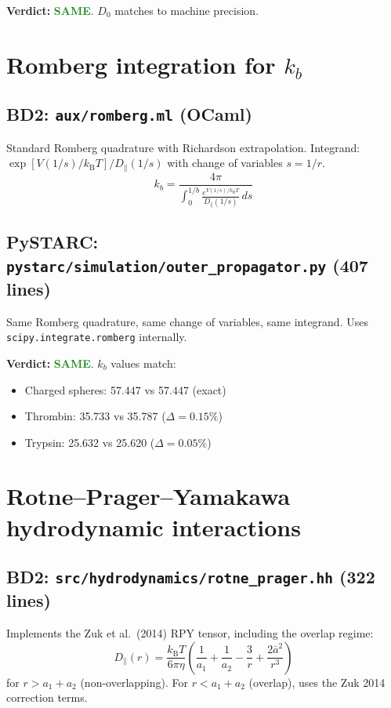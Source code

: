 \documentclass[11pt]{article}
\newcommand{\kBT}{k_{\mathrm{B}}T}
\newcommand{\same}{\textcolor{ForestGreen}{\textbf{SAME}}}
\begin{document}
\textbf{Verdict:} \same. $D_0$ matches to machine precision.


\section{Romberg integration for $k_b$}

\subsection{BD2: \texttt{aux/romberg.ml} (OCaml)}
Standard Romberg quadrature with Richardson extrapolation.
Integrand: $\exp[V(1/s)/\kBT] / D_\parallel(1/s)$ with change of variables $s = 1/r$.
\begin{equation}
k_b = \frac{4\pi}{\int_0^{1/b} \frac{e^{V(1/s)/\kBT}}{D_\parallel(1/s)}\,ds}
\end{equation}

\subsection{PySTARC: \texttt{pystarc/simulation/outer\_propagator.py} (407 lines)}
Same Romberg quadrature, same change of variables, same integrand.
Uses \texttt{scipy.integrate.romberg} internally.

\textbf{Verdict:} \same. $k_b$ values match:
\begin{itemize}
\item Charged spheres: 57.447 vs 57.447 (exact)
\item Thrombin: 35.733 vs 35.787 ($\Delta = 0.15\%$)
\item Trypsin: 25.632 vs 25.620 ($\Delta = 0.05\%$)
\end{itemize}


\section{Rotne--Prager--Yamakawa hydrodynamic interactions}

\subsection{BD2: \texttt{src/hydrodynamics/rotne\_prager.hh} (322 lines)}
Implements the Zuk et al.\ (2014) RPY tensor, including the overlap regime:
\begin{equation}
D_\parallel(r) = \frac{\kBT}{6\pi\eta}
\left(\frac{1}{a_1}+\frac{1}{a_2}-\frac{3}{r}+\frac{2\bar{a}^2}{r^3}\right)
\end{equation}
for $r > a_1 + a_2$ (non-overlapping). For $r < a_1 + a_2$ (overlap),
uses the Zuk 2014 correction terms.
\end{document}
